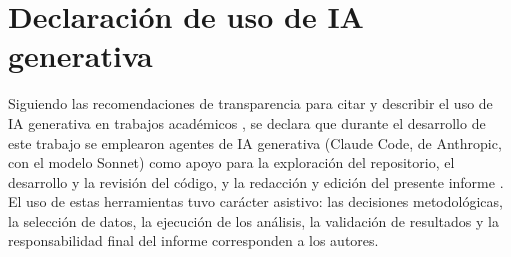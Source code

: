 \documentclass[doc,11pt,donotrepeattitle]{apa7}
\begin{document}








\section*{Declaración de uso de IA generativa}

Siguiendo las recomendaciones de transparencia para citar y describir el uso de IA generativa
en trabajos académicos \parencite{mcadoo2025generativeai}, se declara que durante el desarrollo
de este trabajo se emplearon agentes de IA generativa (Claude Code, de Anthropic, con el
modelo Sonnet) como apoyo para la exploración del repositorio, el desarrollo y la revisión del
código, y la redacción y edición del presente informe \parencite{anthropic2026claude_code_sonnet}.
El uso de estas herramientas tuvo carácter asistivo: las decisiones metodológicas, la selección
de datos, la ejecución de los análisis, la validación de resultados y la responsabilidad final
del informe corresponden a los autores.

\newpage
\printbibliography[title={Referencias bibliográficas}, heading=bibintoc]


\end{document}
